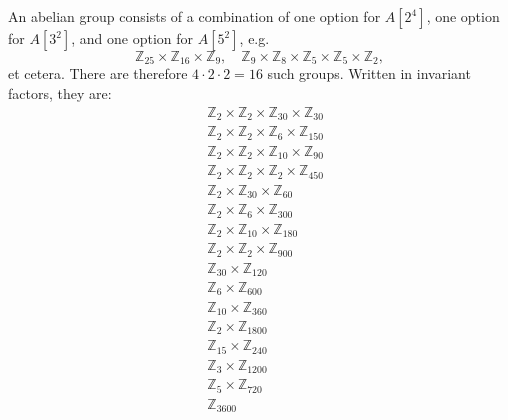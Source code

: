 \documentclass{article}
\begin{document}
\begin{Answer}
\begin{enumerate}[(a)]
{    An abelian group consists of a combination of one option for
    $A[2^4]$, one option for $A[3^2]$, and one option for $A[5^2]$, e.g.
    $$
    \mathbb{Z}_{25} \times \mathbb{Z}_{16} \times \mathbb{Z}_{9},
    \quad
    \mathbb{Z}_{9} \times \mathbb{Z}_{8} \times \mathbb{Z}_5 \times
    \mathbb{Z}_5 \times \mathbb{Z}_2,
    $$
    et cetera. There are therefore $4 \cdot 2 \cdot 2 = 16$ such
    groups. Written in invariant factors, they are:
    \begin{align*}
      & \mathbb{Z}_{2} \times \mathbb{Z}_{2} \times \mathbb{Z}_{30} \times \mathbb{Z}_{30} \\
      & \mathbb{Z}_{2} \times \mathbb{Z}_{2} \times \mathbb{Z}_{6} \times \mathbb{Z}_{150} \\
      & \mathbb{Z}_{2} \times \mathbb{Z}_{2} \times \mathbb{Z}_{10} \times \mathbb{Z}_{90} \\
      & \mathbb{Z}_{2} \times \mathbb{Z}_{2} \times \mathbb{Z}_{2} \times \mathbb{Z}_{450} \\
      & \mathbb{Z}_{2} \times \mathbb{Z}_{30} \times \mathbb{Z}_{60}                      \\
      & \mathbb{Z}_{2} \times \mathbb{Z}_{6} \times \mathbb{Z}_{300}                      \\
      & \mathbb{Z}_{2} \times \mathbb{Z}_{10} \times \mathbb{Z}_{180}                     \\
      & \mathbb{Z}_{2} \times \mathbb{Z}_{2} \times \mathbb{Z}_{900}                      \\
      & \mathbb{Z}_{30} \times \mathbb{Z}_{120}                                           \\
      & \mathbb{Z}_{6} \times \mathbb{Z}_{600}                                            \\
      & \mathbb{Z}_{10} \times \mathbb{Z}_{360}                                           \\
      & \mathbb{Z}_{2} \times \mathbb{Z}_{1800}                                           \\
      & \mathbb{Z}_{15} \times \mathbb{Z}_{240}                                           \\
      & \mathbb{Z}_{3} \times \mathbb{Z}_{1200}                                           \\
      & \mathbb{Z}_{5} \times \mathbb{Z}_{720}                                            \\
      & \mathbb{Z}_{3600}
    \end{align*}

}
\end{enumerate}
\end{Answer}
\end{document}
